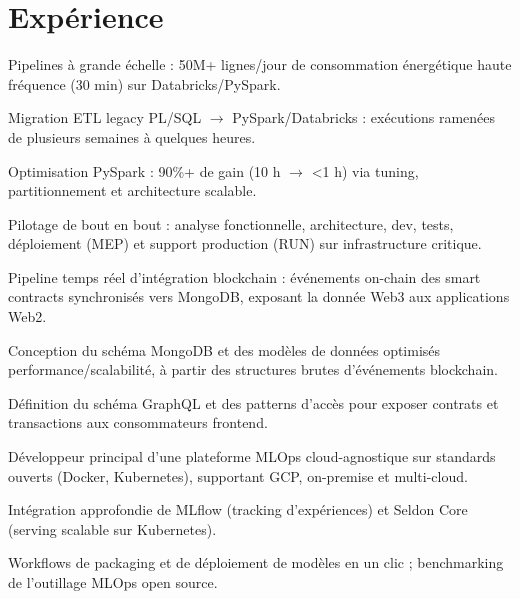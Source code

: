 \documentclass[french]{plushcv}
\begin{document}
\begin{minipage}[t]{0.74\textwidth}

\section{Expérience}

\hfill
{}
\vspace{\topsep}
\begin{tightemize}
\sectionsep
\item Pipelines à grande échelle : 50M+ lignes/jour de consommation énergétique haute fréquence (30 min) sur Databricks/PySpark.
\item Migration ETL legacy PL/SQL $\rightarrow$ PySpark/Databricks : exécutions ramenées de plusieurs semaines à quelques heures.
\item Optimisation PySpark : 90\%+ de gain (10 h $\rightarrow$ <1 h) via tuning, partitionnement et architecture scalable.
\item Pilotage de bout en bout : analyse fonctionnelle, architecture, dev, tests, déploiement (MEP) et support production (RUN) sur infrastructure critique.
\end{tightemize}
\sectionsep
\sectionsep

\hfill
{}
\vspace{5pt}
\begin{tightemize}
\sectionsep
\item Pipeline temps réel d'intégration blockchain : événements on-chain des smart contracts synchronisés vers MongoDB, exposant la donnée Web3 aux applications Web2.
\item Conception du schéma MongoDB et des modèles de données optimisés performance/scalabilité, à partir des structures brutes d'événements blockchain.
\item Définition du schéma GraphQL et des patterns d'accès pour exposer contrats et transactions aux consommateurs frontend.
\end{tightemize}
\sectionsep
\sectionsep

\hfill
{}
\vspace{5pt}
\begin{tightemize}
\sectionsep
\item Développeur principal d'une plateforme MLOps cloud-agnostique sur standards ouverts (Docker, Kubernetes), supportant GCP, on-premise et multi-cloud.
\item Intégration approfondie de MLflow (tracking d'expériences) et Seldon Core (serving scalable sur Kubernetes).
\item Workflows de packaging et de déploiement de modèles en un clic ; benchmarking de l'outillage MLOps open source.
\end{tightemize}
\sectionsep
\sectionsep


\end{minipage}
\end{document}
